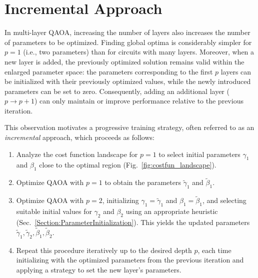 \section{Incremental Approach}
\label{Section:IncrementalApproach}

In multi-layer QAOA, increasing the number of layers also increases the number of parameters
to be optimized. Finding global optima is considerably simpler for $p=1$ (i.e., two parameters)
than for circuits with many layers. Moreover, when a new layer is added, the previously optimized
solution remains valid within the enlarged parameter space: the parameters corresponding to the
first $p$ layers can be initialized with their previously optimized values, while the newly
introduced parameters can be set to zero. Consequently, adding an additional layer
($p \rightarrow p+1$) can only maintain or improve performance relative to the previous iteration.

This observation motivates a progressive training strategy, often referred to as an \emph{incremental}
approach, which proceeds as follows:
\begin{enumerate}
    \item Analyze the cost function landscape for $p=1$ to select initial parameters 
    $\gamma_1$ and $\beta_1$ close to the optimal region (Fig.~\ref{fig:costfun_landscape}).
    \item Optimize QAOA with $p=1$ to obtain the parameters 
    $\widetilde{\gamma}_1$ and $\widetilde{\beta}_1$.
    \item Optimize QAOA with $p=2$, initializing 
    $\gamma_1=\widetilde{\gamma}_1$ and $\beta_1=\widetilde{\beta}_1$, 
    and selecting suitable initial values for $\gamma_2$ and $\beta_2$ using an appropriate
    heuristic (Sec.~\ref{Section:ParameterInitialization}). This yields the updated parameters 
    $\widetilde{\gamma}_1, \widetilde{\gamma}_2, \widetilde{\beta}_1, \widetilde{\beta}_2$.
    \item Repeat this procedure iteratively up to the desired depth $p$, each time initializing
    with the optimized parameters from the previous iteration and applying a strategy to set
    the new layer's parameters.
\end{enumerate}

